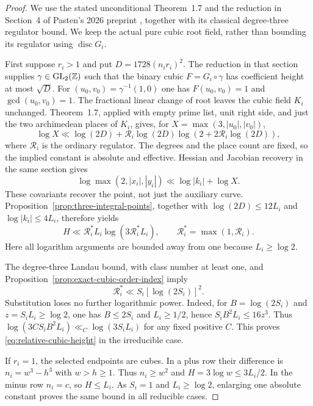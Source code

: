 \begin{proof}
We use the stated unconditional Theorem~1.7 and the reduction in
Section~4 of Pasten's 2026 preprint \cite{PastenNew}, together with
its classical degree-three regulator bound. We keep the actual pure
cubic root field, rather than bounding its regulator using
$\operatorname{disc}G_i$.

First suppose $r_i>1$ and put $D=1728(n_i r_i)^2$.
The reduction in that section supplies $\gamma\in\operatorname{GL}_2(\mathbb Z)$ such
that the binary cubic $F=G_i\circ\gamma$ has coefficient height at
most $\sqrt D$. For $(u_0,v_0)=\gamma^{-1}(1,0)$ one has
$F(u_0,v_0)=1$ and $\gcd(u_0,v_0)=1$. The fractional linear change
of root leaves the cubic field $K_i$ unchanged. Theorem~1.7, applied
with empty prime list, unit right side, and just the two archimedean
places of $K_i$, gives, for $X=\max(3,|u_0|,|v_0|)$,
\begin{equation}\label{eq:relative-thue-input}
 \log X\ll \log(2D)+\mathcal R_i\log(2D)
          \log(2+2\mathcal R_i\log(2D)),
\end{equation}
where $\mathcal R_i$ is the ordinary regulator. The degrees and the
place count are fixed, so the implied constant is absolute and
effective. Hessian and Jacobian recovery in the same section gives
\[
 \log\max(2,|x_i|,|y_i|)\ll\log|k_i|+\log X.
\]
These covariants recover the point, not just the auxiliary curve.
Proposition~\ref{prop:three-integral-points}, together with
$\log(2D)\le12L_i$ and $\log|k_i|\le4L_i$, therefore yields
\[
 H\ll \mathcal R_i^*L_i\log(3\mathcal R_i^*L_i),
 \qquad \mathcal R_i^*=\max(1,\mathcal R_i).
\]
Here all logarithm arguments are bounded away from one because
$L_i\ge\log2$.

The degree-three Landau bound, with class number at least one, and
Proposition~\ref{prop:exact-cubic-order-index} imply
\[
 \mathcal R_i^*\ll S_i[\log(2S_i)]^2.
\]
Substitution loses no further logarithmic power. Indeed, for
$B=\log(2S_i)$ and $z=S_iL_i\ge\log2$, one has $B\le2S_i$ and
$L_i\ge1/2$, hence $S_iB^2L_i\le16z^3$.
Thus $\log(3C S_iB^2L_i)\ll_C\log(3S_iL_i)$ for any fixed positive
$C$. This proves \eqref{eq:relative-cubic-height} in the irreducible case.

If $r_i=1$, the selected endpoints are cubes. In a plus row their
difference is $n_i=w^3-h^3$ with $w>h\ge1$. Thus $n_i\ge w^2$ and
$H=3\log w\le3L_i/2$. In the minus row $n_i=c$, so $H\le L_i$.
As $S_i=1$ and $L_i\ge\log2$, enlarging one absolute constant proves
the same bound in all reducible cases.
\end{proof}

